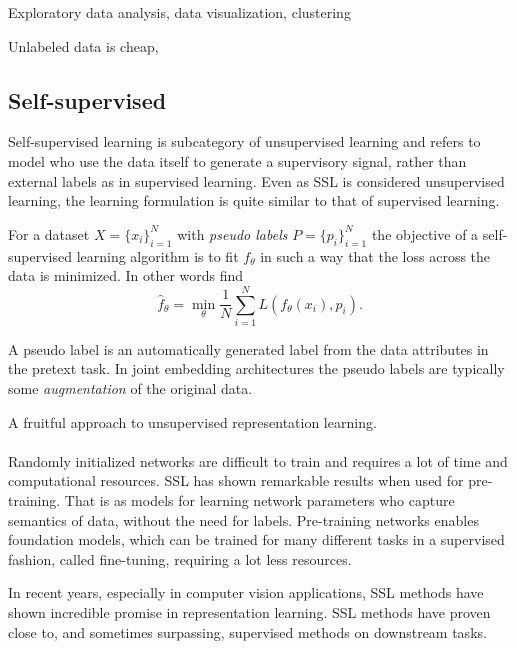 \documentclass[../../thesis.tex]{subfiles}
\begin{document}
Exploratory data analysis, data visualization, clustering

Unlabeled data is cheap, 

\subsection{Self-supervised}
Self-supervised learning is subcategory of unsupervised learning and refers to model who use the data itself to generate a supervisory signal, rather than external labels as in supervised learning. Even as SSL is considered unsupervised learning, the learning formulation is quite similar to that of supervised learning.\newline

For a dataset $X = \{x_i\}_{i=1}^N$ with \textit{pseudo labels} $P = \{p_i\}_{i=1}^N$ the objective of a self-supervised learning algorithm is to fit $f_\theta$ in such a way that the loss across the data is minimized. In other words find 
\begin{equation}
    \widehat{f}_\theta = \min_\theta \frac{1}{N} \sum_{i=1}^N L(f_\theta(x_i),p_i).
\end{equation}

A pseudo label is an automatically generated label from the data attributes in the pretext task. In joint embedding architectures the pseudo labels are typically some \textit{augmentation} of the original data.



A fruitful approach to unsupervised representation learning.\\\\

Randomly initialized networks are difficult to train and requires a lot of time and computational resources. SSL has shown remarkable results when used for pre-training. That is as models for learning network parameters who capture semantics of data, without the need for labels. Pre-training networks enables foundation models, which can be trained for many different tasks in a supervised fashion, called fine-tuning, requiring a lot less resources.

In recent years, especially in computer vision applications, SSL methods have shown incredible promise in representation learning. SSL methods have proven close to, and sometimes surpassing, supervised methods on downstream tasks. 
\end{document}
